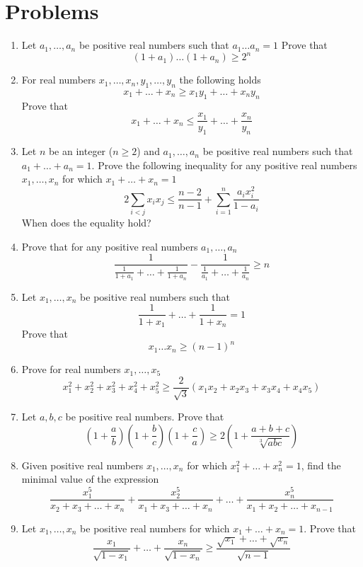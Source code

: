\documentclass{article}
\begin{document}
	\newpage
\section*{Problems}
	\begin{enumerate}
	\item %
	Let $a_1,\dots,a_n$ be positive real numbers such that $a_1\dots a_n =1$ Prove that 
	$$(1+a_1)\dots (1+a_n) \geq 2^n$$
	\item %
	For real numbers $x_1, \dots , x_n, y_1, \dots , y_n$ the following holds
	$$x_1+\dots+x_n \geq x_1y_1 + \dots + x_ny_n$$
	Prove that
	$$x_1+\dots+x_n \leq \frac{x_1}{y_1} + \dots + \frac{x_n}{y_n}$$
	
	\item %
	Let $n$ be an integer ($n\geq 2$) and $a_1,\dots,a_n$ be positive real numbers such that $a_1+\dots+a_n=1$. Prove the following inequality for any positive real numbers $x_1,\dots,x_n$ for which $x_1+\dots+x_n=1$ 
	$$2\sum_{i<j} x_ix_j \leq \frac{n-2}{n-1} + \sum_{i=1}^n \frac{a_ix_i^2}{1-a_i}$$
	When does the equality hold?
	
	\item %
	Prove that for any positive real numbers $a_1,\dots,a_n$
	$$\frac{1}{\frac{1}{1+a_1}+\dots+\frac{1}{1+a_n}} - \frac{1}{\frac{1}{a_1}+\dots+\frac{1}{a_n}} \geq n$$
	
	\item %
	Let $x_1,\dots,x_n$ be positive real numbers such that
	$$\frac{1}{1+x_1} + \dots + \frac{1}{1+x_n}=1$$
	Prove that
	$$x_1 \dots x_n \geq (n-1)^n$$
	
	\item %
	Prove for real numbers $x_1,\dots,x_5$
	$$x_1^2 + x_2^2 + x_3^2 + x_4^2 + x_5^2 \geq \frac{2}{\sqrt{3}}(x_1x_2 + x_2x_3 + x_3x_4 + x_4x_5) $$
	
	\item %
	Let $a,b,c$ be positive real numbers. Prove that
	$$\left(1+\frac{a}{b}\right) \left(1+\frac{b}{c}\right)  \left(1+\frac{c}{a}\right) \geq 
	2\left(1+\frac{a+b+c}{\sqrt[3]{abc}}\right)$$
	
	\item %
	Given positive real numbers $x_1,\dots,x_n$ for which $x_1^2+\dots+x_n^2=1$, find the minimal value of the expression
	$$\frac{x_1^5}{x_2+x_3+\dots+x_n} + \frac{x_2^5}{x_1+x_3+\dots+x_n} + \dots +\frac{x_n^5}{x_1+x_2+\dots+x_{n-1}}$$
	
	\item %
	Let $x_1,\dots,x_n$ be positive real numbers for which $x_1+\dots+x_n=1$. Prove that
	$$\frac{x_1}{\sqrt{1-x_1}} + \dots + \frac{x_n}{\sqrt{1-x_n}} 
	\geq
	\frac{\sqrt{x_1}+\dots+\sqrt{x_n}}{\sqrt{n-1}} $$
	
	
	
\end{enumerate}
\end{document}
